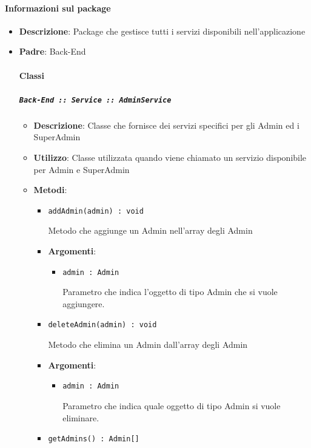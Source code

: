\documentclass[../DefinizioneDiProdotto.tex]{subfiles}
\begin{document}
	\paragraph{Informazioni sul package}\begin{itemize}\item \textbf{Descrizione}: Package che gestisce tutti i servizi disponibili nell'applicazione\item \textbf{Padre}: Back-End\paragraph{Classi}
	\subparagraph{\texttt{Back-End :: Service :: AdminService}}
	\begin{itemize}\item \textbf{Descrizione}: Classe che fornisce dei servizi specifici per gli Admin ed i SuperAdmin
	\item \textbf{Utilizzo}: Classe utilizzata quando viene chiamato un servizio disponibile per Admin e SuperAdmin
	\item \textbf{Metodi}:
	\begin{itemize}
	\item \texttt{addAdmin(admin) : void}\

	 Metodo che aggiunge un Admin nell'array degli Admin

	\item \textbf{Argomenti}:
	\begin{itemize}
	\item \texttt{admin : Admin}\

	 Parametro che indica l'oggetto di tipo Admin che si vuole aggiungere.
	\end{itemize}
	\end{itemize}\vspace{0.5em}
	\begin{itemize}
	\item \texttt{deleteAdmin(admin) : void}\

	 Metodo che elimina un Admin dall'array degli Admin

	\item \textbf{Argomenti}:
	\begin{itemize}
	\item \texttt{admin : Admin}\

	 Parametro che indica quale oggetto di tipo Admin si vuole eliminare.
	\end{itemize}
	\end{itemize}\vspace{0.5em}
	\begin{itemize}
	\item \texttt{getAdmins() : Admin[]}\


\end{itemize}
\end{itemize}
\end{itemize}
\end{document}

